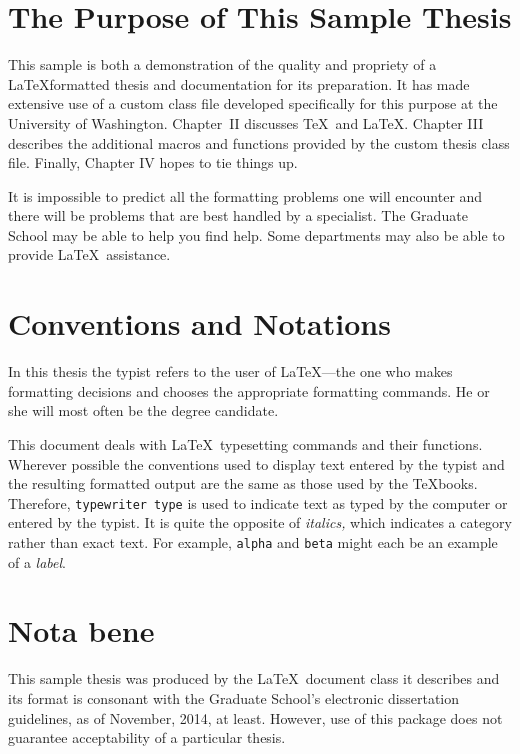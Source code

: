 \documentclass [11pt, proquest] {uwthesis}[2020/02/24]
\begin{document}
\section{The Purpose of This Sample Thesis}

This sample is both a demonstration of the quality and
propriety of a \LaTeX formatted thesis and
documentation for its preparation.
It has made extensive use of a custom class file
developed specifically for this purpose
at the University of Washington.  Chapter~II discusses
\TeX\ and \LaTeX.
Chapter III describes the additional macros and functions
provided by the custom thesis class file.  Finally, Chapter IV hopes to tie things up.

It is
impossible to predict all the formatting problems one will encounter
and there will be problems that are best handled
by a specialist.
The Graduate School may be able to help you find help.
Some departments may also be able to provide \LaTeX\ assistance.


\section{Conventions and Notations}

In this thesis the typist
refers to the user of \LaTeX---the one who
makes formatting decisions and chooses the appropriate
formatting commands.
He or she will most often be the degree candidate.

This document deals with \LaTeX\ typesetting commands and their
functions.  Wherever possible the conventions used to display
text entered by the typist and the resulting formatted output
are the same as those used by the \TeX books.
Therefore, {\tt typewriter type} is used to indicate text
as typed by the computer
or entered by the typist.
It is quite the opposite of {\it italics,} which indicates
a category rather than exact text.  For example,
{\tt alpha} and {\tt beta} might each be an example of a {\it label}.


\section{Nota bene}

This sample thesis was produced by the \LaTeX\ document class it describes
and its format is consonant with the Graduate School's electronic dissertation guidelines,
as of November, 2014, at least.
However, use of this package does not guarantee acceptability
of a particular thesis.
\end{document}
